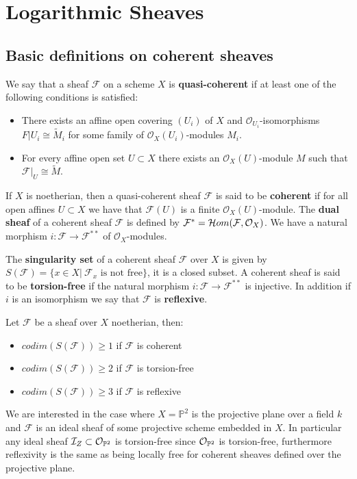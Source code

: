\section{Logarithmic Sheaves}
\subsection{Basic definitions on coherent sheaves}
\begin{definition}\cite[Mumford]{mumford2013red}
We say that a sheaf $\mathcal{F}$ on a scheme $X$ is \textbf{quasi-coherent} if at least one of the following conditions is satisfied:
\begin{itemize}
    \item There exists an affine open covering $(U_i)$ of $X$ and $\mathcal{O}_{U_i}$-isomorphisms $F|{U_i} \cong \widetilde{M}_i$ for some family of $\mathcal{O}_X(U_i)$-modules $M_i$.
    \item For every affine open set $U \subset X$ there exists an $\mathcal{O}_X(U)$-module $M$ such that $\mathcal{F}|_U \cong \widetilde{M}$.
\end{itemize}
If $X$ is noetherian, then a quasi-coherent sheaf $\mathcal{F}$ is said to be \textbf{coherent} if for all open affines $U \subset X$ we have that $\mathcal{F}(U)$ is a finite $\mathcal{O}_X(U)$-module. The \textbf{dual sheaf} of a coherent sheaf $\mathcal{F}$ is defined by $\mathcal{F}^* = \mathcal{H}om(\mathcal{F},\mathcal{O}_X)$. We have a natural morphism $i:\mathcal{F} \to \mathcal{F}^{**}$ of $\mathcal{O}_X$-modules.
\end{definition}
\begin{definition}
The \textbf{singularity set} of a coherent sheaf $\mathcal{F}$ over $X$ is given by $S(\mathcal{F}) = \{x \in X | \ \mathcal{F}_x \text{ is not free}\}$, it is a closed subset. A coherent sheaf is said to be \textbf{torsion-free} if the natural morphism $i:\mathcal{F} \to {\mathcal{F}}^{**}$ is injective. In addition if $i$ is an isomorphism we say that $\mathcal{F}$ is \textbf{reflexive}.
\end{definition}

\begin{proposition}\cite[OSS]{Okonek1980VectorBO}\label{singularitysetcodim}
Let $\mathcal{F}$ be a sheaf over $X$ noetherian, then:
\begin{itemize}
    \item $codim(S(\mathcal{F})) \geq 1$ if $\mathcal{F}$ is coherent
    \item $codim(S(\mathcal{F})) \geq 2$ if $\mathcal{F}$ is torsion-free
    \item $codim(S(\mathcal{F})) \geq 3$ if $\mathcal{F}$ is reflexive
\end{itemize}
\end{proposition}
We are interested in the case where $X = \mathbb{P}^2$ is the projective plane over a field $k$ and $\mathcal{F}$ is an ideal sheaf of some projective scheme embedded in $X$. In particular any ideal sheaf $\mathcal{I}_Z \subset \mathcal{O}_{\mathbb{P}^2}$ is torsion-free since $\mathcal{O}_{\mathbb{P}^2}$ is torsion-free, furthermore reflexivity is the same as being locally free for coherent sheaves defined over the projective plane.
